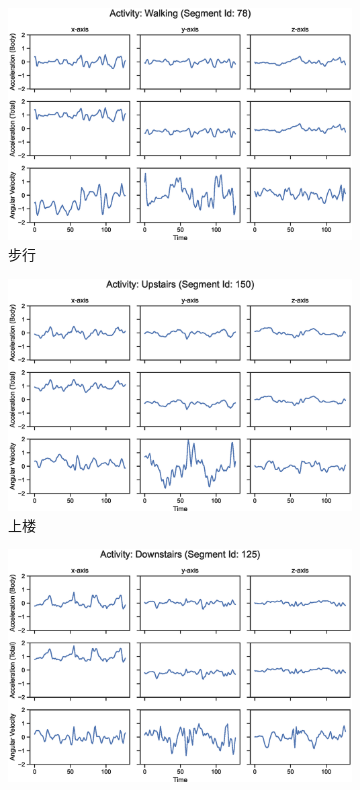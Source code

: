 \documentclass[screen,17pt,cn,founder,mtpro2]{elegantnote}
\begin{document}
\begin{figure}
    \begin{subfigure}{.33\textwidth}
        \centering
        \includegraphics[width=\linewidth]{images/activity-walking-segment-78.eps}
        \caption{步行}
    \end{subfigure}
    \begin{subfigure}{.33\textwidth}
        \centering
        \includegraphics[width=\linewidth]{images/activity-upstairs-segment-150.eps}
        \caption{上楼}
    \end{subfigure}
    \begin{subfigure}{.33\textwidth}
        \centering
        \includegraphics[width=\linewidth]{images/activity-downstairs-segment-125.eps}

\end{subfigure}
\end{figure}
\end{document}
